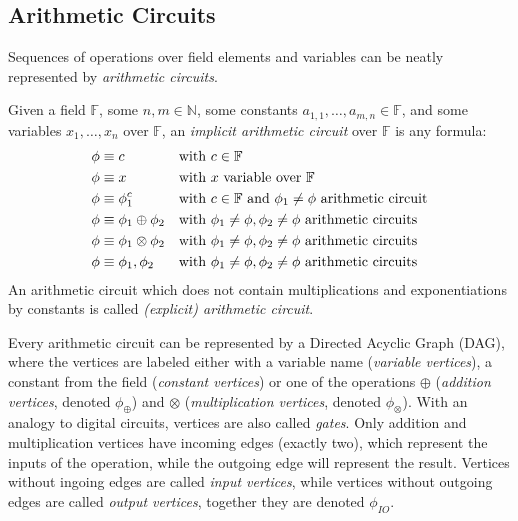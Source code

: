 
\subsection{Arithmetic Circuits}
Sequences of operations over field elements and variables can be neatly represented by
\emph{arithmetic circuits}.
\begin{definition}
	Given a field \(\mathbb{F}\), some \(n, m \in \mathbb{N}\), some constants
	\(a_{1, 1}, \dots, a_{m, n} \in \mathbb{F}\), and some variables \(x_1, \dots, x_n \) over
	\(\mathbb{F}\), an \emph{implicit arithmetic circuit} over \(\mathbb{F}\) is any formula:
	\begin{align*}
		 & \phi \equiv c                     &  & \textnormal{with \(c \in \mathbb{F}\)}
		\\
		 & \phi \equiv x                     &  & \textnormal{with \(x\) variable over
			\(\mathbb{F}\)}
		\\
		 & \phi \equiv \phi_1^c              &  & \textnormal{with \(c \in \mathbb{F}\) and
			\(\phi_1 \neq \phi \) arithmetic circuit}
		\\
		 & \phi \equiv \phi_1 \oplus \phi_2  &  & \textnormal{with \(\phi_1 \neq \phi, \phi_2 \neq
			\phi \)
			arithmetic circuits}
		\\
		 & \phi \equiv \phi_1 \otimes \phi_2 &  & \textnormal{with \(\phi_1 \neq \phi, \phi_2 \neq
			\phi \)
			arithmetic circuits}
		\\
		 & \phi \equiv \phi_1, \phi_2        &  & \textnormal{with \(\phi_1 \neq \phi, \phi_2 \neq
			\phi \)
			arithmetic circuits}
	\end{align*}
	An arithmetic circuit which does not contain multiplications and exponentiations by constants
	is called \emph{(explicit) arithmetic circuit}.
\end{definition}

\noindent Every arithmetic circuit can be represented by a Directed Acyclic Graph (DAG),
where the vertices are labeled either with a variable name (\emph{variable vertices}), a constant
from the field (\emph{constant vertices}) or one of the operations \(\oplus \)
(\emph{addition vertices}, denoted \(\phi_\oplus \)) and \(\otimes \) 
(\emph{multiplication vertices}, denoted \(\phi_\otimes \)).
With an analogy to digital circuits, vertices are also called \emph{gates}.
Only addition and multiplication vertices have incoming edges (exactly two), which represent the
inputs of the operation, while the outgoing edge will represent the result.
Vertices without ingoing edges are called \emph{input vertices}, while vertices without outgoing
edges are called \emph{output vertices}, together they are denoted \(\phi_{IO}\).


